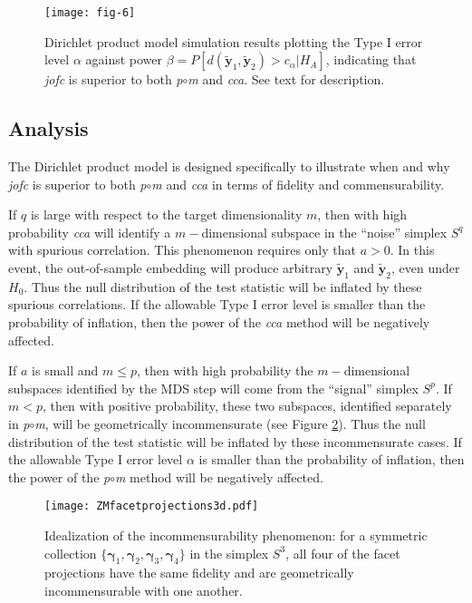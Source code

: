 \documentclass[12pt,xcolor]{article}
\newcommand{\1}{\ensuremath{\mbox{{\bf 1}}}}
\begin{document}
\begin{figure}[h]
\begin{center}
  \texttt{[image: fig-6]}
\caption{
Dirichlet product model
simulation results
plotting the Type I error level $\alpha$ against power $\beta = P[d(\widetilde{\bm{y}}_1,\widetilde{\bm{y}}_2)>c_{\alpha} | H_A]$,
indicating that {\em jofc} is superior to both {\it p}$\circ${\it m} and {\em cca}. See text for description.
}\label{fig:simrocD}
\end{center}
\end{figure}

\subsection{Analysis}

The Dirichlet product model
is designed specifically to illustrate when and why {\em jofc} is superior to both {\it p}$\circ${\it m} and {\em cca}
in terms of fidelity and commensurability.

If $q$ is large with respect to the target dimensionality $m$,
then with high probability {\em cca} will identify a $m-$dimensional subspace in the ``noise'' simplex $S^q$ with spurious correlation.
This phenomenon requires only that $a>0$.
In this event, the out-of-sample embedding will produce arbitrary $\widetilde{\bm{y}}_1$ and $\widetilde{\bm{y}}_2$,
even under $H_0$.
Thus the null distribution of the test statistic will be inflated by these spurious correlations.
If the allowable Type I error level is smaller than the probability of inflation,
then the power of the {\em cca} method will be negatively affected.

If $a$ is small and $m \leq p$, then with high probability the $m-$dimensional subspaces identified by the MDS step
will come from the ``signal'' simplex $S^p$.
If $m<p$, then with positive probability, these two subspaces,
identified separately in {\it p}$\circ${\it m},
will be geometrically incommensurate (see Figure \ref{fig:incomm}).
Thus the null distribution of the test statistic will be inflated by these incommensurate cases.
If the allowable Type I error level $\alpha$ is smaller than the probability of inflation,
then the power of the {\it p}$\circ${\it m} method will be negatively affected.

  \begin{figure}
  \begin{center}
    \texttt{[image: ZMfacetprojections3d.pdf]}
    \caption{Idealization of the incommensurability phenomenon:
    for a symmetric collection $\{\bm{\gamma}_1,\bm{\gamma}_2,\bm{\gamma}_3,\bm{\gamma}_4\}$ in the simplex $S^3$,
    all four of the facet projections have the same fidelity and are geometrically incommensurable with one another.}\label{fig:incomm}
  \end{center}
  \end{figure}
\end{document}
